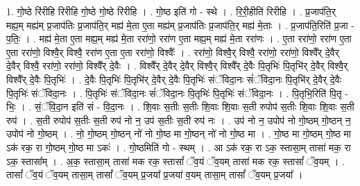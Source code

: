 \documentclass[17pt]{extarticle}
\begin{document}
1. गो॒ष्ठे रि॑रीहि रिरीहि गो॒ष्ठे गो॒ष्ठे रि॑रीहि । . गो॒ष्ठ इति॑ गो - स्थे । . रि॒री॒हीति॑ रिरीहि । . प्र॒जाप॑ति॒र् मह्य॒म् मह्य॑म् प्र॒जाप॑तिः प्र॒जाप॑ति॒र् मह्य॑ मे॒ता ए॒ता मह्य॑म् प्र॒जाप॑तिः प्र॒जाप॑ति॒र् मह्य॑ मे॒ताः । . प्र॒जाप॑ति॒रिति॑ प्र॒जा - प॒तिः॒ । . मह्य॑ मे॒ता ए॒ता मह्य॒म् मह्य॑ मे॒ता ररा॑णो॒ ररा॑ण ए॒ता मह्य॒म् मह्य॑ मे॒ता ररा॑णः । . ए॒ता ररा॑णो॒ ररा॑ण ए॒ता ए॒ता ररा॑णो॒ विश्वै॒र् विश्वै॒ ररा॑ण ए॒ता ए॒ता ररा॑णो॒ विश्वैः᳚ । . ररा॑णो॒ विश्वै॒र् विश्वै॒ ररा॑णो॒ ररा॑णो॒ विश्वै᳚र् दे॒वैर् दे॒वैर् विश्वै॒ ररा॑णो॒ ररा॑णो॒ विश्वै᳚र् दे॒वैः । . विश्वै᳚र् दे॒वैर् दे॒वैर् विश्वै॒र् विश्वै᳚र् दे॒वैः पि॒तृभिः॑ पि॒तृभि॑र् दे॒वैर् विश्वै॒र् विश्वै᳚र् दे॒वैः पि॒तृभिः॑ । . दे॒वैः पि॒तृभिः॑ पि॒तृभि॑र् दे॒वैर् दे॒वैः पि॒तृभिः॑ संॅविदा॒नः सं॑ॅविदा॒नः पि॒तृभि॑र् दे॒वैर् दे॒वैः पि॒तृभिः॑ संॅविदा॒नः । . पि॒तृभिः॑ संॅविदा॒नः सं॑ॅविदा॒नः पि॒तृभिः॑ पि॒तृभिः॑ संॅविदा॒नः । . पि॒तृभि॒रिति॑ पि॒तृ - भिः॒ । . सं॒ॅवि॒दा॒न इति॑ सं - वि॒दा॒नः । . शि॒वाः स॒तीः स॒तीः शि॒वाः शि॒वाः स॒ती रुपोप॑ स॒तीः शि॒वाः शि॒वाः स॒ती रुप॑ । . स॒ती रुपोप॑ स॒तीः स॒ती रुप॑ नो न॒ उप॑ स॒तीः स॒ती रुप॑ नः । . उप॑ नो न॒ उपोप॑ नो गो॒ष्ठम् गो॒ष्ठन् न॒ उपोप॑ नो गो॒ष्ठम् । . नो॒ गो॒ष्ठम् गो॒ष्ठन् नो॑ नो गो॒ष्ठ मा गो॒ष्ठन् नो॑ नो गो॒ष्ठ मा । . गो॒ष्ठ मा गो॒ष्ठम् गो॒ष्ठ मा ऽक॑ रक॒ रा गो॒ष्ठम् गो॒ष्ठ मा ऽकः॑ । . गो॒ष्ठमिति॑ गो - स्थम् । . आ ऽक॑ रक॒ रा ऽक॒ स्तासा॒म् तासा॑ मक॒ रा ऽक॒ स्तासा᳚म् । . अ॒क॒ स्तासा॒म् तासा॑ मक रक॒ स्तासां᳚ ॅव॒यं ॅव॒यम् तासा॑ मक रक॒ स्तासां᳚ ॅव॒यम् । . तासां᳚ ॅव॒यं ॅव॒यम् तासा॒म् तासां᳚ ॅव॒यम् प्र॒जया᳚ प्र॒जया॑ व॒यम् तासा॒म् तासां᳚ ॅव॒यम् प्र॒जया᳚ । \newline
\end{document}
